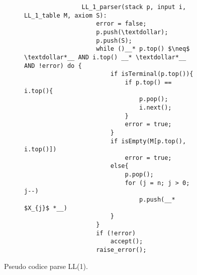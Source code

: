 \documentclass{subfiles}
\begin{document}
\begin{figure}[h!]
    \centering
    \begin{subfigure}[b]{0.7\textwidth}
        \begin{lstlisting}
                LL_1_parser(stack p, input i, LL_1_table M, axiom S):
                    error = false;
                    p.push(\textdollar);
                    p.push(S);
                    while ()__* p.top() $\neq$ \textdollar*__ AND i.top() __* \textdollar*__ AND !error) do {
                        if isTerminal(p.top()){
                            if p.top() == i.top(){
                                p.pop();
                                i.next();
                            }
                            error = true;
                        }
                        if isEmpty(M[p.top(), i.top()])
                            error = true;
                        else{
                            p.pop();
                            for (j = n; j > 0; j--)
                                p.push(__* $X_{j}$ *__)
                        }
                    }
                    if (!error)
                        accept();
                    raise_error();
            \end{lstlisting}
    \end{subfigure}
    \caption{Pseudo codice parse LL(1).}
    \label{fig:5}
\end{figure}
\end{document}
